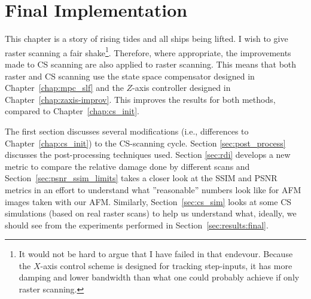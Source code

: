 \section{Final Implementation}\label{chap:afm-cs-final}

This chapter is a story of rising tides and all ships being lifted. I wish to give raster scanning a fair shake\footnote{It would not be hard to argue that I have failed in that endevour. Because the $X$-axis control scheme is designed for tracking step-inputs, it has more damping and lower bandwidth than what one could probably achieve if only raster scanning.}. Therefore, where appropriate, the improvements made to CS scanning are also applied to raster scanning. This means that both raster and CS scanning use the state space compensator designed in Chapter~\ref{chap:mpc_slf} and the $Z$-axis controller designed in Chapter~\ref{chap:zaxis-improv}.
This improves the results for both methods, compared to Chapter~\ref{chap:cs_init}. 

 The first section discusses several modifications (i.e., differences to Chapter~\ref{chap:cs_init}) to the CS-scanning cycle. Section \ref{sec:post_process} discusses the post-processing techniques used. Section \ref{sec:rdi} develops a new metric to compare the relative damage done by different scans and Section~\ref{sec:psnr_ssim_limits} takes a closer look at the SSIM and PSNR metrics in an effort to understand what ''reasonable'' numbers look like for AFM images taken with our AFM. Similarly, Section~\ref{sec:cs_sim} looks at some CS simulations (based on real raster scans) to help us understand what, ideally, we should see from the experiments performed in Section~\ref{sec:results:final}. 

